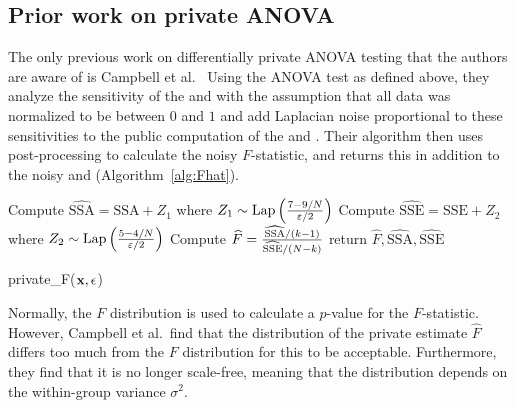 \subsection{Prior work on private ANOVA}

The only previous work on differentially private ANOVA testing that the authors are aware of is Campbell et al.~\cite{campbell2018diffprivanova} Using the ANOVA test as defined above, they analyze the sensitivity of the \ssa and \sse with the assumption that all data was normalized to be between $0$ and $1$ and add Laplacian noise proportional to these sensitivities to the public computation of the \ssa and \sse. Their algorithm then uses post-processing to calculate the noisy $F$-statistic, and returns this in addition to the noisy \ssa and \sse (Algorithm~\ref{alg:Fhat}). 
\begin{algorithm}
    \begin{algorithmic}
        \STATE Compute $\widehat{\text{SSA}} = \text{SSA} + Z_1$ where $Z_1\sim\text{Lap}\left(\frac{7 - 9/N}{\varepsilon/2}\right)$
        \STATE Compute $\widehat{\text{SSE}} = \text{SSE} + Z_2$ where $Z_2\sim\text{Lap}\left(\frac{5-4/N}{\varepsilon/2}\right)$
        \STATE Compute $\widehat{F} = \frac{\widehat{\text{SSA}}/(k-1)}{\widehat{\text{SSE}}/(N-k)}$
        \STATE return $\widehat{F}, \widehat{\text{SSA}}, \widehat{\text{SSE}}$
    \end{algorithmic}
    \caption{private\_F($\mathbf{x}, \epsilon$)} 
     \label{alg:Fhat}
\end{algorithm}

Normally, the $F$ distribution is used to calculate a $p$-value for the $F$-statistic. However, Campbell et al.~find that the distribution of the private estimate $\widehat{F}$ differs too much from the $F$ distribution for this to be acceptable.  Furthermore, they find that it is no longer scale-free, meaning that the distribution depends on the within-group variance $\sigma^2$.  


